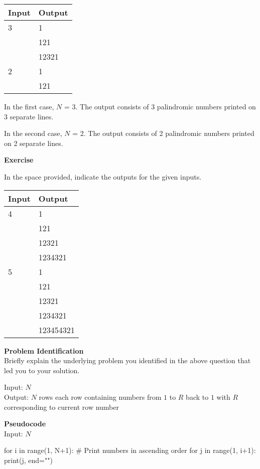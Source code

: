 \documentclass[a4paper]{exam}
\newcommand\heading[1]{\textbf{#1}}
\begin{document}
\begin{questions}
  \begin{tabularx}{\textwidth}{|X|X|}
    \rowcolor{gray!50}
    \hline
    Input & Output \\ \hline\hline
    3  & 1 \\
    & 121 \\
    & 12321 \\\hline
    2  & 1 \\
    & 121\\\hline
  \end{tabularx}

  In the first case, $N$ = 3. The output consists of 3 palindromic numbers printed on 3 separate lines.

  In the second case, $N$ = 2. The output consists of 2 palindromic numbers printed on 2 separate lines.

  \heading{Exercise}

  In the space provided, indicate the outputs for the given inputs.

  \begin{tabularx}{\textwidth}{|X|X|}
    \rowcolor{gray!50}
    \hline
    Input  & Output \\ \hline\hline
    4   &    1\\
    & 121 \\
    & 12321 \\
    & 1234321
            \\\hline
    5 & 1       \\
    &   121     \\
    &   12321     \\
    &   1234321     \\
    &    123454321    \\\hline
  \end{tabularx}

  \heading{Problem Identification}\\
  Briefly explain the underlying problem you identified in the above question that led you to your solution.
    \begin{mdframed}
        Input: $N$ \\
        Output: $N$ rows each row containing numbers from $1$ to $R$ back to $1$ with $R$ corresponding to current row number 
    \end{mdframed}  
  \heading{Pseudocode} \\
  Input: $N$
  \begin{python}
    for i in range(1, N+1):
    # Print numbers in ascending order
        for j in range(1, i+1):
            print(j, end="")


\end{python}
\end{questions}
\end{document}
